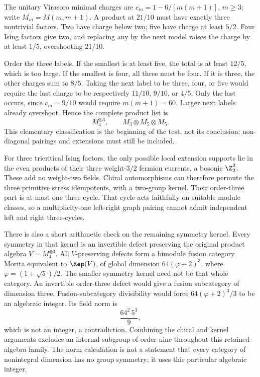 \begin{example}[All minimal-model products at $c=21/10$]
The unitary Virasoro minimal charges are
$c_m=1-6/[m(m+1)]$, $m\geq3$; write $M_m=M(m,m+1)$.
A product at $21/10$ must have
exactly three nontrivial factors. Two have charge below two;
five have charge at least $5/2$. Four Ising factors give two,
and replacing any by the next model raises the charge by at
least $1/5$, overshooting $21/10$.

Order the three labels. If the smallest is at least five, the
total is at least $12/5$, which is too large. If the smallest is four, all three must
be four. If it is three, the other charges sum to $8/5$.
Taking the next label to be three, four, or five would require
the last charge to be respectively $11/10$, $9/10$, or $4/5$.
Only the last occurs, since $c_m=9/10$ would require
$m(m+1)=60$. Larger next labels already overshoot. Hence the
complete product list is
\[
 M_4^{\otimes3},\qquad M_3\otimes M_5\otimes M_5.
\]
This elementary classification is the beginning of the test,
not its conclusion; non-diagonal pairings and extensions must
still be included.
\end{example}

For three tricritical Ising factors, the only possible local
extension supports lie in the even products of their three
weight-$3/2$ fermion currents, a bosonic $\Z_2^2$. These add no
weight-two fields. Chiral automorphisms can therefore permute
the three primitive stress idempotents, with a two-group kernel.
Their order-three part is at most one three-cycle. That cycle
acts faithfully on suitable module classes, so a multiplicity-one
left-right graph pairing cannot admit independent left and right
three-cycles.

There is also a short arithmetic check on the remaining symmetry
kernel. Every symmetry in that kernel is an invertible defect
preserving the original product algebra $V=M_4^{\otimes3}$.
All $V$-preserving defects form a bimodule fusion category Morita
equivalent to $\Rep(V)$, of global dimension
$64(\varphi+2)^3$, where $\varphi=(1+\sqrt5)/2$. The smaller
symmetry kernel need not be that whole category. An invertible
order-three defect would give a fusion subcategory of dimension
three. Fusion-subcategory divisibility would force
$64(\varphi+2)^3/3$ to be an algebraic integer. Its field norm is
\[
 \frac{64^2\,5^3}{9},
\]
which is not an integer, a contradiction. Combining the chiral
and kernel arguments excludes an internal subgroup of order nine
throughout this retained-algebra family. The norm calculation is
not a statement that every category of nonintegral dimension has
no group symmetry; it uses this particular algebraic integer.

